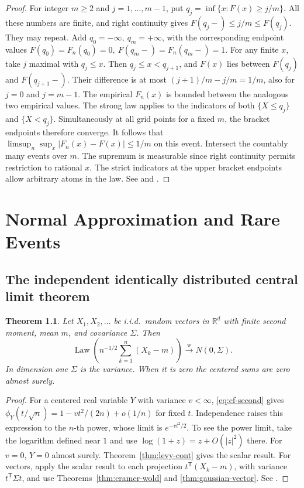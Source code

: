\documentclass[11pt,oneside,openany]{book}
\newcommand{\R}{\mathbb{R}}
\DeclareMathOperator{\Law}{Law}
\newcommand{\weakto}{\xrightarrow{\mathrm{w}}}
\theoremstyle{plain}
\newtheorem{theorem}{Theorem}[chapter]
\theoremstyle{definition}
\theoremstyle{remark}
\begin{document}
\begin{proof}
For integer \(m\ge2\) and \(j=1,\ldots,m-1\), put
\(q_j=\inf\{x:F(x)\ge j/m\}\).
All these numbers are finite, and right continuity gives
\(F(q_j-)\le j/m\le F(q_j)\). They may repeat. Add
\(q_0=-\infty,\ q_m=+\infty\), with the corresponding endpoint
values \(F(q_0)=F_n(q_0)=0,\ F(q_m-)=F_n(q_m-)=1\).
For any finite \(x\), take \(j\) maximal with \(q_j\le x\). Then
\(q_j\le x<q_{j+1}\), and \(F(x)\) lies between
\(F(q_j)\) and \(F(q_{j+1}-)\). Their difference is at most
\((j+1)/m-j/m=1/m\), also for \(j=0\) and \(j=m-1\).
The empirical \(F_n(x)\) is bounded between the analogous two empirical
values. The strong law applies to the indicators of both \(\{X\le q_j\}\)
and \(\{X<q_j\}\). Simultaneously at all grid points for a fixed \(m\),
the bracket endpoints therefore converge. It follows that
\(\limsup_n\sup_x|F_n(x)-F(x)|\le1/m\) on this event.
Intersect the countably many events over \(m\). The supremum is
measurable since right continuity permits restriction to rational
\(x\). The strict indicators at the upper bracket endpoints allow
arbitrary atoms in the law. See \cite[Theorem 2.4.9]{Durrett} and
\cite[Proposition 5.24]{Kallenberg}.
\end{proof}
\chapter{Normal Approximation and Rare Events}
\label{chap:clt}

\section{The independent identically distributed central limit theorem}
\label{p09-01}

\begin{theorem}\label{thm:iid-clt}
Let \(X_1,X_2,\ldots\) be i.i.d.\ random vectors in \(\R^d\) with
finite second moment, mean \(m\), and covariance \(\Sigma\).
Then
\[
 \Law\left(n^{-1/2}\sum_{k=1}^n(X_k-m)\right)\weakto N(0,\Sigma).
\]
In dimension one \(\Sigma\) is the variance. When it is zero the
centered sums are zero almost surely.
\end{theorem}

\begin{proof}
For a centered real variable \(Y\) with variance \(v<\infty\),
\eqref{eq:cf-second} gives
\(\phi_Y(t/\sqrt n)=1-vt^2/(2n)+o(1/n)\) for fixed \(t\).
Independence raises this expression to the \(n\)-th power,
whose limit is \(e^{-vt^2/2}\). To see the power limit,
take the logarithm defined near \(1\) and use
\(\log(1+z)=z+O(|z|^2)\) there. For \(v=0\), \(Y=0\) almost surely.
Theorem~\ref{thm:levy-cont} gives the scalar result. For vectors,
apply the scalar result to each projection \(t^\mathsf{T}(X_k-m)\),
with variance \(t^\mathsf{T}\Sigma t\), and use
Theorems~\ref{thm:cramer-wold} and \ref{thm:gaussian-vector}.
See \cite[Theorem 3.4.1 and Section 3.10]{Durrett}.
\end{proof}
\end{document}
